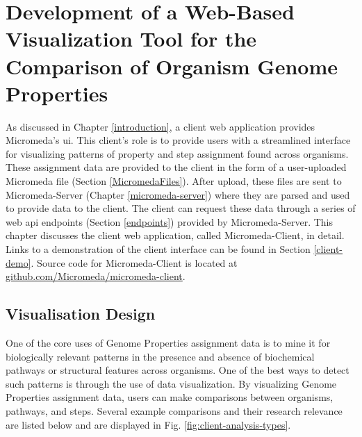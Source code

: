 \chapter{Development of a Web-Based Visualization Tool for the Comparison of 
Organism Genome Properties} \label{micromeda-client}

As discussed in Chapter \ref{introduction}, a client web application provides 
Micromeda's \gls{ui}. This client's role is to provide users with a streamlined 
interface for visualizing patterns of property and step assignment found across 
organisms. These assignment data are provided to the client in the form of a 
user-uploaded Micromeda file (Section \ref{MicromedaFiles}). After upload, these 
files are sent to Micromeda-Server (Chapter \ref{micromeda-server}) where they 
are parsed and used to provide data to the client. The client can request these 
data through a series of web \gls{api} endpoints (Section \ref{endpoints}) 
provided by Micromeda-Server. This chapter discusses the client web application, 
called Micromeda-Client, in detail. Links to a demonstration of the client 
interface can be found in Section \ref{client-demo}. Source code for Micromeda-Client is 
located at 
\href{https://github.com/Micromeda/micromeda-client}{github.com/Micromeda/micromeda-client}.

\section{Visualisation Design} \label{visualization-design}

One of the core uses of Genome Properties assignment data is to mine it for 
biologically relevant patterns in the presence and absence of biochemical 
pathways or structural features across organisms. One of the best ways to detect 
such patterns is through the use of data visualization. By visualizing Genome 
Properties assignment data, users can make comparisons between organisms, 
pathways, and steps. Several example comparisons and their research relevance 
are listed below and are displayed in Fig. \ref{fig:client-analysis-types}. 

